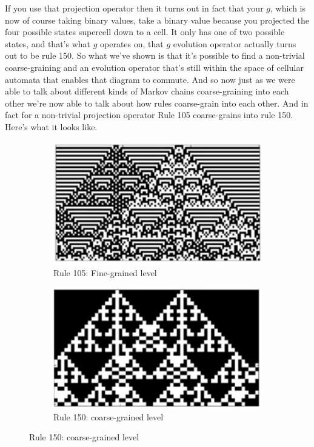 \documentclass[]{article}
\begin{document}
If you use that projection operator then it turns out in fact that your $g$,
which is now of course taking binary values, take a binary value because you projected the four possible states supercell down to a cell.
It only has one of two possible states,
and that's what $g$ operates on,
that $g$ evolution operator actually turns out to be rule 150.
So what we've shown
is that it's possible to find a non-trivial coarse-graining and an evolution operator that's still within the space of
cellular automata  that enables that diagram to commute.
And so now just as we were able to talk about different kinds of
Markov chains coarse-graining into each other
we're now able to talk about how
rules coarse-grain into each other.
And in fact for a non-trivial projection operator Rule 105 coarse-grains into rule 150.
Here's what it looks like.
\begin{figure}[H]
	\caption[Rule 105 coarse-grains into rule 150]{Rule 105 coarse-grains into rule 150 by a non-trivial projection operator (based on a figure in \cite{israeli2004computational})}\label{fig:105:coarse:grained}
	\begin{subfigure}[t]{0.45\textwidth}
		\caption{Rule 105: Fine-grained level}\label{fig:fine:grain}
		\includegraphics[width=\textwidth]{fine-grain-ca}
	\end{subfigure}
	\hfill
	\begin{subfigure}[t]{0.45\textwidth}
		\caption{Rule 150: coarse-grained level}
		\includegraphics[width=\textwidth]{coarse-grain-ca}
	\end{subfigure}
\end{figure}
\end{document}
